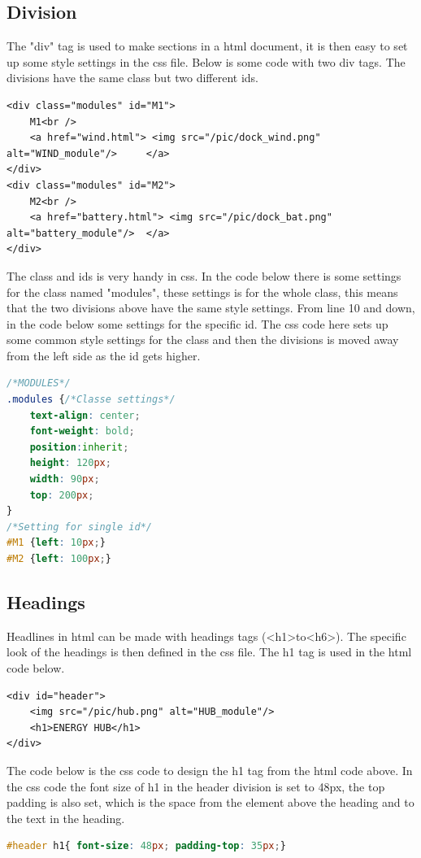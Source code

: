 \subsection{Division}
The "div" tag is used to make sections in a html document, it is then easy to set up some style settings in the css file. Below is some code with two div tags. The divisions have the same class but two different ids.
\begin{lstlisting}
<div class="modules" id="M1">		
	M1<br />
	<a href="wind.html"> <img src="/pic/dock_wind.png"		alt="WIND_module"/> 	</a>
</div>
<div class="modules" id="M2">
	M2<br />
	<a href="battery.html"> <img src="/pic/dock_bat.png" 	alt="battery_module"/>	</a>
</div>
\end{lstlisting}
The class and ids is very handy in css. In the code below there is some settings for the class named "modules", these settings is for the whole class, this means that the two divisions above have the same style settings. From line 10 and down, in the code below some settings for the specific id. The css code here sets up some common style settings for the class and then the divisions is moved away from the left side as the id gets higher.
\begin{lstlisting}[language=CSS]
/*MODULES*/
.modules {/*Classe settings*/
	text-align: center;
	font-weight: bold;
	position:inherit;
	height: 120px;
	width: 90px;
	top: 200px;
}
/*Setting for single id*/
#M1	{left: 10px;}
#M2	{left: 100px;}
\end{lstlisting}

\subsection{Headings}
Headlines in html can be made with headings tags (\textless h1\textgreater  to\textless h6\textgreater). The specific look of the headings is then defined in the css file. The h1 tag is used in the html code below.
\begin{lstlisting}
<div id="header">
	<img src="/pic/hub.png" alt="HUB_module"/>
	<h1>ENERGY HUB</h1>
</div>
\end{lstlisting}
The code below is the css code to design the h1 tag from the html code above. In the css code the font size of h1 in the header division is set to 48px, the top padding is also set, which is the space from the element above the heading and to the text in the heading.
\begin{lstlisting}[language=CSS]
#header h1{ font-size: 48px; padding-top: 35px;}
\end{lstlisting}

